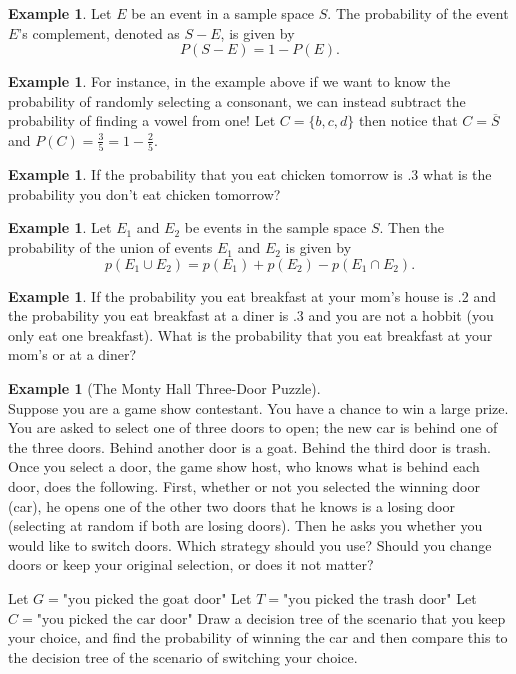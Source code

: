 \documentclass[letterpaper,10pt]{article}
\theoremstyle{plain}
\theoremstyle{definition}
\newtheorem{exmp}[thm]{Example}
\theoremstyle{remark}
\begin{document}
\begin{exmp}
    Let $E$ be an event in a sample space $S$. The probability of the event $E$'s complement, denoted as $S - E$, is given by
    \[
    P(S-E) = 1 - P(E).
    \]
\end{exmp}
\begin{exmp}
For instance, in the example above if we want to know the probability of randomly selecting a consonant, we can instead subtract the probability of finding a vowel from one!
\newline
Let $C=\{b,c,d\}$ then notice that $C=\overline{S}$ and $P(C)=\frac{3}{5}=1-\frac{2}{5}$.
\newline
\end{exmp}
\begin{exmp}
If the probability that you eat chicken tomorrow is $.3$ what is the probability you don't eat chicken tomorrow?
\vspace{2cm}
\end{exmp}

\begin{exmp}
    Let $E_1$ and $E_2$ be events in the sample space $S$. Then the probability of the union of events $E_1$ and $E_2$ is given by
    \[
    p(E_1 \cup E_2) = p(E_1) + p(E_2) - p(E_1 \cap E_2).
    \]
\end{exmp}
\begin{exmp}
If the probability you eat breakfast at your mom's house is .2 and the probability you eat breakfast at a diner is .3 and you are not a hobbit (you only eat one breakfast).
What is the probability that you eat breakfast at your mom's or at a diner?
\vspace{2cm}
\end{exmp}
\begin{exmp}[The Monty Hall Three-Door Puzzle] $ $\\ Suppose you are a game show contestant. You have a
chance to win a large prize. You are asked to select one of three doors to open; the new car
is behind one of the three doors. Behind another door is a goat. Behind the third door is trash. Once you select a door, the
game show host, who knows what is behind each door, does the following. First, whether or not
you selected the winning door (car), he opens one of the other two doors that he knows is a losing
door (selecting at random if both are losing doors). Then he asks you whether you would like to
switch doors. Which strategy should you use? Should you change doors or keep your original
selection, or does it not matter?

\noindent Let $G={\text{"you picked the goat door"}}$
\newline
Let $T={\text{"you picked the trash door"}}$
\newline
Let $C={\text{"you picked the car door"}}$
\newline
Draw a decision tree of the scenario that you keep your choice, and find the probability of winning the car and then compare this to the decision tree of the scenario of switching your choice.
\vspace{3cm}
\end{exmp}
\end{document}
